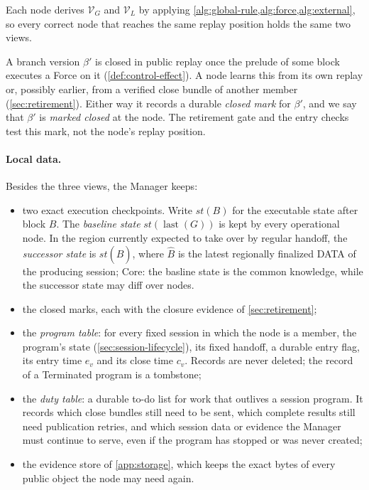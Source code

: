 \documentclass[11pt,a4paper]{article}
\newcommand{\defterm}[1]{\textcolor{rrBlue}{\textit{#1}}}
\begin{document}
Each node derives $\mathcal V_G$ and $\mathcal V_L$ by applying
\cref{alg:global-rule,alg:force,alg:external}, so every correct node that
reaches the same replay position holds the same two views.

A branch version $\beta'$ is closed in public replay once the prelude
of some block executes a Force on it (\cref{def:control-effect}). A node
learns this from its own replay or, possibly earlier, from a verified
close bundle of another member (\cref{sec:retirement}). Either way it
records a durable \defterm{closed mark} for $\beta'$, and we say that
$\beta'$ is \defterm{marked closed} at the node. The retirement gate and
the entry checks test this mark, not the node's replay position.

\paragraph{Local data.}
Besides the three views, the Manager keeps:
\begin{itemize}
\item two exact execution checkpoints. Write $\mathit{st}(B)$ for the
executable state after block $B$. The \defterm{baseline state}
$\mathit{st}(\operatorname{last}(G))$ is kept by every operational node.
In the region currently expected to take over by regular handoff, the
\defterm{successor state} is $\mathit{st}(\hat B)$, where $\hat B$ is the
latest regionally finalized DATA of the producing session; Core: the basline state is the common knowledge, while the successor state may diff over nodes. 
\item the closed marks, each with the closure evidence of
\cref{sec:retirement};
\item the \defterm{program table}: for every fixed session in which the
node is a member, the program's state (\cref{sec:session-lifecycle}), its
fixed handoff, a durable entry flag, its entry time $e_v$ and its close
time $c_v$. Records are never deleted; the record of a Terminated
program is a tombstone;
\item the \defterm{duty table}: a durable to-do list for work that
outlives a session program.  It records which close bundles still need
to be sent, which complete results still need publication retries, and
which session data or evidence the Manager must continue to serve, even
if the program has stopped or was never created;
\item the evidence store of \cref{app:storage}, which keeps the exact
bytes of every public object the node may need again.
\end{itemize}
\end{document}
